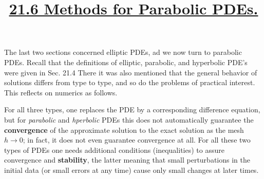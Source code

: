 \title{\underline{\LARGE{\textbf{21.6 Methods for Parabolic PDEs.}}} \\ {\Large\itshape }} %
\maketitle 
\vspace{5pt} 
\newline
\pagestyle{fancy}
The last two sections concerned elliptic PDEs, ad we now turn to parabolic PDEs. Recall that the definitions of elliptic, parabolic, and hyperbolic PDE's were given in Sec. 21.4 There it was also mentioned that the general behavior of solutions differs from type to type, and so do the problems of practical interest. This reflects on numerics as follows.

For all three types, one replaces the PDE by a corresponding difference equation, but for \textit{parabolic} and \textit{hperbolic} PDEs this does not automatically guarantee the \textbf{convergence} of the approximate solution to the exact solution as the mesh $h\rightarrow0$; in fact, it does not even guarantee convergence at all. For all these two types of PDEs one needs additional conditions (inequalities) to assure convergence and \textbf{stability}, the latter meaning that small perturbations in the initial data (or small errors at any time) cause only small changes at later times.

